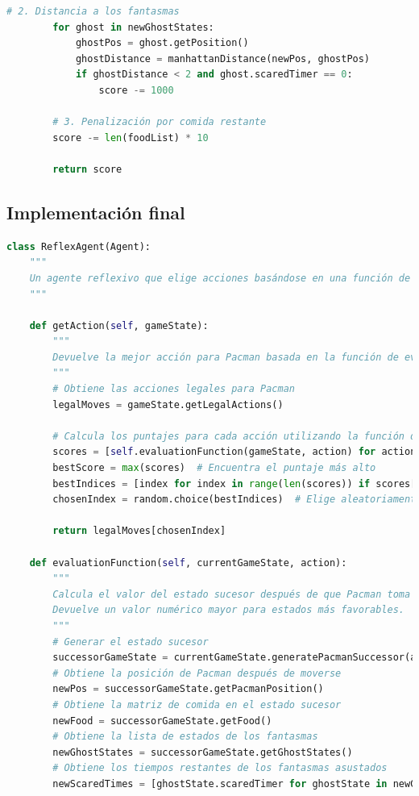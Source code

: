 \documentclass{report}
\begin{document}
\begin{lstlisting}[language=Python, caption=Implementación inicial del agente reflex]
        # 2. Distancia a los fantasmas
        for ghost in newGhostStates:
            ghostPos = ghost.getPosition()
            ghostDistance = manhattanDistance(newPos, ghostPos)
            if ghostDistance < 2 and ghost.scaredTimer == 0:
                score -= 1000

        # 3. Penalización por comida restante
        score -= len(foodList) * 10

        return score
          \end{lstlisting}
        \subsection*{Implementación final}
          \begin{lstlisting}[language=Python, caption=Implementación final del agente reflex]
class ReflexAgent(Agent):
    """
    Un agente reflexivo que elige acciones basándose en una función de evaluación.
    """

    def getAction(self, gameState):
        """
        Devuelve la mejor acción para Pacman basada en la función de evaluación.
        """
        # Obtiene las acciones legales para Pacman
        legalMoves = gameState.getLegalActions()

        # Calcula los puntajes para cada acción utilizando la función de evaluación
        scores = [self.evaluationFunction(gameState, action) for action in legalMoves]
        bestScore = max(scores)  # Encuentra el puntaje más alto
        bestIndices = [index for index in range(len(scores)) if scores[index] == bestScore]
        chosenIndex = random.choice(bestIndices)  # Elige aleatoriamente entre las mejores acciones

        return legalMoves[chosenIndex]

    def evaluationFunction(self, currentGameState, action):
        """
        Calcula el valor del estado sucesor después de que Pacman toma la acción `action`.
        Devuelve un valor numérico mayor para estados más favorables.
        """
        # Generar el estado sucesor
        successorGameState = currentGameState.generatePacmanSuccessor(action)
        # Obtiene la posición de Pacman después de moverse
        newPos = successorGameState.getPacmanPosition()
        # Obtiene la matriz de comida en el estado sucesor
        newFood = successorGameState.getFood()
        # Obtiene la lista de estados de los fantasmas
        newGhostStates = successorGameState.getGhostStates()
        # Obtiene los tiempos restantes de los fantasmas asustados
        newScaredTimes = [ghostState.scaredTimer for ghostState in newGhostStates]


\end{lstlisting}
\end{document}
